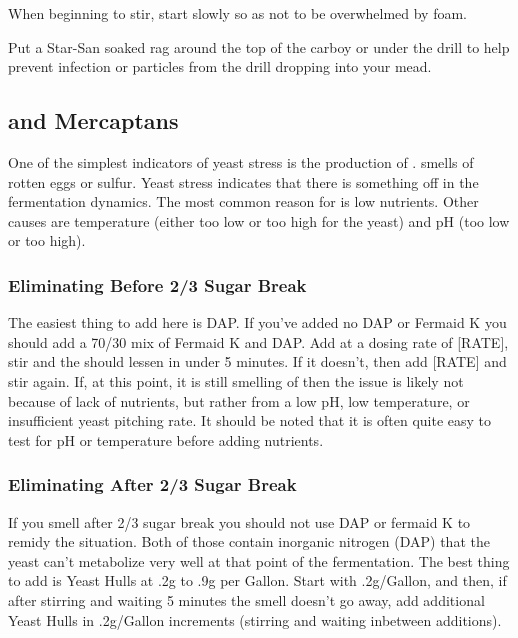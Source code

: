 \documentclass{article}
\begin{document}
   When beginning to stir, start slowly so as not to be overwhelmed by foam. 

   Put a Star-San soaked rag around the top of the carboy or under the drill to help prevent infection or particles from the drill dropping into your mead.

 \subsection{ and Mercaptans}
  One of the simplest indicators of yeast stress is the production of .  smells of rotten eggs or sulfur. Yeast stress indicates that there is
  something off in the fermentation dynamics. The most common reason for  is low nutrients. Other causes are temperature (either too low or too high for 
  the yeast) and pH (too low or too high).

  \subsubsection{Eliminating Before 2/3 Sugar Break}
   The easiest thing to add here is DAP. If you've added no DAP or Fermaid K you should add a 70/30 mix of Fermaid K and DAP. Add at a dosing rate of [RATE], stir and the 
    should lessen in under 5 minutes. If it doesn't, then add [RATE] and stir again. If, at this point, it is still smelling of  then the issue is likely
   not because of lack of nutrients, but rather from a low pH, low temperature, or insufficient yeast pitching rate. It should be noted that it is often quite easy 
   to test for pH or temperature before adding nutrients.

  \subsubsection{Eliminating After 2/3 Sugar Break} 
   If you smell  after 2/3 sugar break you should not use DAP or fermaid K to remidy the situation. Both of those contain inorganic nitrogen (DAP) 
   that the yeast can't metabolize very well at that point of the fermentation. The best thing to add is Yeast Hulls at .2g to .9g per Gallon. Start with .2g/Gallon, and
   then, if after stirring and waiting 5 minutes the  smell doesn't go away, add additional Yeast Hulls in .2g/Gallon increments (stirring and waiting inbetween
   additions).
\end{document}
